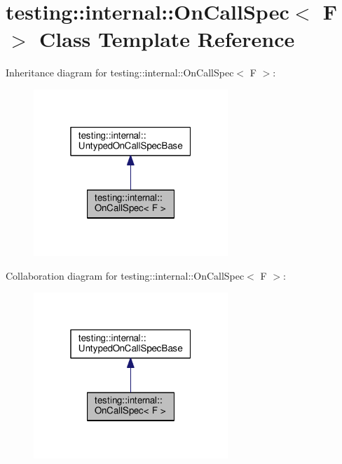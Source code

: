 \hypertarget{classtesting_1_1internal_1_1OnCallSpec}{}\section{testing\+:\+:internal\+:\+:On\+Call\+Spec$<$ F $>$ Class Template Reference}
\label{classtesting_1_1internal_1_1OnCallSpec}


Inheritance diagram for testing\+:\+:internal\+:\+:On\+Call\+Spec$<$ F $>$\+:\nopagebreak
\begin{figure}[H]
\begin{center}
\leavevmode
\includegraphics[width=208pt]{classtesting_1_1internal_1_1OnCallSpec__inherit__graph}
\end{center}
\end{figure}


Collaboration diagram for testing\+:\+:internal\+:\+:On\+Call\+Spec$<$ F $>$\+:\nopagebreak
\begin{figure}[H]
\begin{center}
\leavevmode
\includegraphics[width=208pt]{classtesting_1_1internal_1_1OnCallSpec__coll__graph}
\end{center}
\end{figure}
